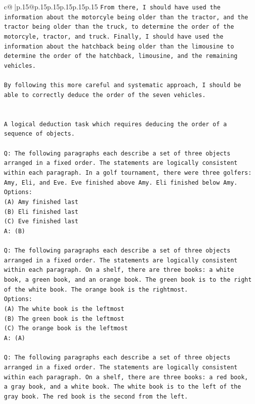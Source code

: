 \documentclass{article}
\begin{document}
{\begin{supertabular}{c@{$\;$}|p{.15\linewidth}@{}p{.15\linewidth}p{.15\linewidth}p{.15\linewidth}p{.15\linewidth}p{.15\linewidth}}
{{{\texttt{From there, I should have used the information about the motorcyle being older than the tractor, and the tractor being older than the truck, to determine the order of the motorcyle, tractor, and truck. Finally, I should have used the information about the hatchback being older than the limousine to determine the order of the hatchback, limousine, and the remaining vehicles.} \\
\\ 
\texttt{By following this more careful and systematic approach, I should be able to correctly deduce the order of the seven vehicles.} \\
\\ 
\\ 
\texttt{A logical deduction task which requires deducing the order of a sequence of objects.} \\
\\ 
\texttt{Q: The following paragraphs each describe a set of three objects arranged in a fixed order. The statements are logically consistent within each paragraph. In a golf tournament, there were three golfers: Amy, Eli, and Eve. Eve finished above Amy. Eli finished below Amy.} \\
\texttt{Options:} \\
\texttt{(A) Amy finished last} \\
\texttt{(B) Eli finished last} \\
\texttt{(C) Eve finished last} \\
\texttt{A: (B)} \\
\\ 
\texttt{Q: The following paragraphs each describe a set of three objects arranged in a fixed order. The statements are logically consistent within each paragraph. On a shelf, there are three books: a white book, a green book, and an orange book. The green book is to the right of the white book. The orange book is the rightmost.} \\
\texttt{Options:} \\
\texttt{(A) The white book is the leftmost} \\
\texttt{(B) The green book is the leftmost} \\
\texttt{(C) The orange book is the leftmost} \\
\texttt{A: (A)} \\
\\ 
\texttt{Q: The following paragraphs each describe a set of three objects arranged in a fixed order. The statements are logically consistent within each paragraph. On a shelf, there are three books: a red book, a gray book, and a white book. The white book is to the left of the gray book. The red book is the second from the left.} \\
}}}
\end{supertabular}}
\end{document}
